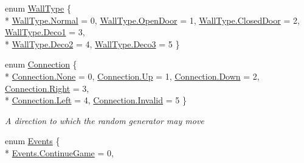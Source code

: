 \begin{DoxyCompactItemize}
enum \hyperlink{namespace_gruppe22_1_1_backend_ab19de7e2856537f39fbd380beea6ddba}{Wall\-Type} \{ \\*
\hyperlink{namespace_gruppe22_1_1_backend_ab19de7e2856537f39fbd380beea6ddbaa960b44c579bc2f6818d2daaf9e4c16f0}{Wall\-Type.\-Normal} = 0, 
\hyperlink{namespace_gruppe22_1_1_backend_ab19de7e2856537f39fbd380beea6ddbaa2a39ae68459c1376d004b2fd790adcee}{Wall\-Type.\-Open\-Door} = 1, 
\hyperlink{namespace_gruppe22_1_1_backend_ab19de7e2856537f39fbd380beea6ddbaa9b1667934b038c7ee331485dfa30d8a3}{Wall\-Type.\-Closed\-Door} = 2, 
\hyperlink{namespace_gruppe22_1_1_backend_ab19de7e2856537f39fbd380beea6ddbaa701389ddd32037e473017df249063047}{Wall\-Type.\-Deco1} = 3, 
\\*
\hyperlink{namespace_gruppe22_1_1_backend_ab19de7e2856537f39fbd380beea6ddbaa2ec021329dfcdd0dfbd4870d122f0183}{Wall\-Type.\-Deco2} = 4, 
\hyperlink{namespace_gruppe22_1_1_backend_ab19de7e2856537f39fbd380beea6ddbaa30aef1eeb4692d6bd21bc20b98674fe0}{Wall\-Type.\-Deco3} = 5
 \}
\item 
enum \hyperlink{namespace_gruppe22_1_1_backend_a74373668761d179b11ba50e5980a8674}{Connection} \{ \\*
\hyperlink{namespace_gruppe22_1_1_backend_a74373668761d179b11ba50e5980a8674a6adf97f83acf6453d4a6a4b1070f3754}{Connection.\-None} = 0, 
\hyperlink{namespace_gruppe22_1_1_backend_a74373668761d179b11ba50e5980a8674a258f49887ef8d14ac268c92b02503aaa}{Connection.\-Up} = 1, 
\hyperlink{namespace_gruppe22_1_1_backend_a74373668761d179b11ba50e5980a8674a08a38277b0309070706f6652eeae9a53}{Connection.\-Down} = 2, 
\hyperlink{namespace_gruppe22_1_1_backend_a74373668761d179b11ba50e5980a8674a92b09c7c48c520c3c55e497875da437c}{Connection.\-Right} = 3, 
\\*
\hyperlink{namespace_gruppe22_1_1_backend_a74373668761d179b11ba50e5980a8674a945d5e233cf7d6240f6b783b36a374ff}{Connection.\-Left} = 4, 
\hyperlink{namespace_gruppe22_1_1_backend_a74373668761d179b11ba50e5980a8674a4bbb8f967da6d1a610596d7257179c2b}{Connection.\-Invalid} = 5
 \}
\begin{DoxyCompactList}\small\item\em A direction to which the random generator may move \end{DoxyCompactList}\item 
enum \hyperlink{namespace_gruppe22_1_1_backend_ab56df91bb0bdafa1ea978e552209ce73}{Events} \{ \\*
\hyperlink{namespace_gruppe22_1_1_backend_ab56df91bb0bdafa1ea978e552209ce73a5d3313060b4af773c4a9625ad9eee948}{Events.\-Continue\-Game} = 0, 

\end{DoxyCompactItemize}
